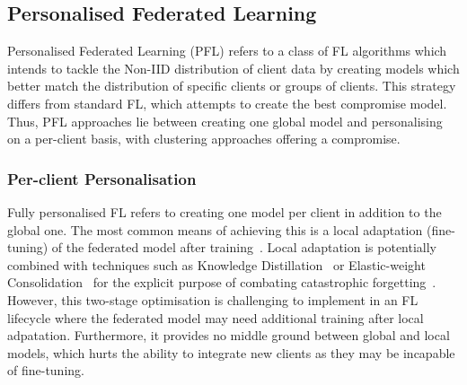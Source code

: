 \subsection{Personalised Federated Learning}

Personalised Federated Learning (PFL) refers to a class of FL algorithms which intends to tackle the Non-IID distribution of client data by creating models which better match the distribution of specific clients or groups of clients. This strategy differs from standard FL, which attempts to create the best compromise model. Thus, PFL approaches lie between creating one global model and personalising on a per-client basis, with clustering approaches offering a compromise.

\subsubsection{Per-client Personalisation}

Fully personalised FL refers to creating one model per client in addition to the global one. The most common means of achieving this is a local adaptation (fine-tuning) of the federated model after training~\citep{SalvagingFL,ThreeApproachesMansour,FinetuningIsFineFL}. Local adaptation is potentially combined with techniques such as Knowledge Distillation~\citep{DeepMutualLearning} or Elastic-weight Consolidation~\citep{kirkpatrick2017overcoming} for the explicit purpose of combating catastrophic forgetting~\citep{CatForgetting1}. However, this two-stage optimisation is challenging to implement in an FL lifecycle where the federated model may need additional training after local adpatation. Furthermore, it provides no middle ground between global and local models, which hurts the ability to integrate new clients as they may be incapable of fine-tuning.

